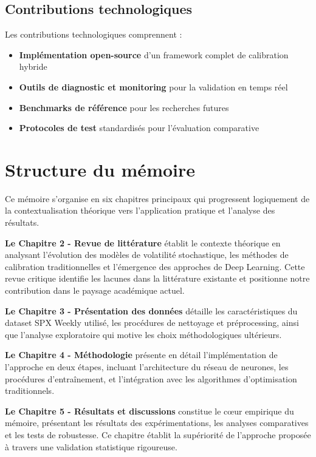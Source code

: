 \subsection{Contributions technologiques}

Les contributions technologiques comprennent :

\begin{itemize}
\item \textbf{Implémentation open-source} d'un framework complet de calibration hybride
\item \textbf{Outils de diagnostic et monitoring} pour la validation en temps réel
\item \textbf{Benchmarks de référence} pour les recherches futures
\item \textbf{Protocoles de test} standardisés pour l'évaluation comparative
\end{itemize}

\section{Structure du mémoire}

Ce mémoire s'organise en six chapitres principaux qui progressent logiquement de la contextualisation théorique vers l'application pratique et l'analyse des résultats.

\textbf{Le Chapitre 2 - Revue de littérature} établit le contexte théorique en analysant l'évolution des modèles de volatilité stochastique, les méthodes de calibration traditionnelles et l'émergence des approches de Deep Learning. Cette revue critique identifie les lacunes dans la littérature existante et positionne notre contribution dans le paysage académique actuel.

\textbf{Le Chapitre 3 - Présentation des données} détaille les caractéristiques du dataset SPX Weekly utilisé, les procédures de nettoyage et préprocessing, ainsi que l'analyse exploratoire qui motive les choix méthodologiques ultérieurs.

\textbf{Le Chapitre 4 - Méthodologie} présente en détail l'implémentation de l'approche en deux étapes, incluant l'architecture du réseau de neurones, les procédures d'entraînement, et l'intégration avec les algorithmes d'optimisation traditionnels.

\textbf{Le Chapitre 5 - Résultats et discussions} constitue le cœur empirique du mémoire, présentant les résultats des expérimentations, les analyses comparatives et les tests de robustesse. Ce chapitre établit la supériorité de l'approche proposée à travers une validation statistique rigoureuse.

